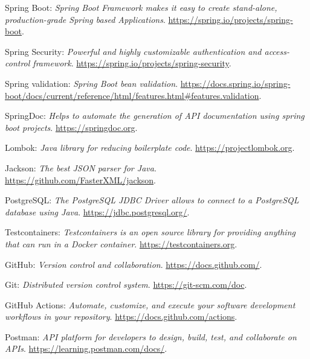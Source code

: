 \begin{thebibliography}{99}
    Spring Boot: \emph{Spring Boot Framework makes it easy to create stand-alone, production-grade Spring based Applications}. \url{https://spring.io/projects/spring-boot}.

    Spring Security: \emph{Powerful and highly customizable authentication and access-control framework}. \url{https://spring.io/projects/spring-security}.

    Spring validation: \emph{Spring Boot bean validation}. \url{https://docs.spring.io/spring-boot/docs/current/reference/html/features.html#features.validation}.

    SpringDoc: \emph{Helps to automate the generation of API documentation using spring boot projects}. \url{https://springdoc.org}.

    Lombok: \emph{Java library for reducing boilerplate code}. \url{https://projectlombok.org}.

    Jackson: \emph{The best JSON parser for Java}. \url{https://github.com/FasterXML/jackson}.

    PostgreSQL: \emph{The PostgreSQL JDBC Driver allows to connect to a PostgreSQL database using Java}. \url{https://jdbc.postgresql.org/}.
    
    Testcontainers: \emph{Testcontainers is an open source library for providing anything that can run in a Docker container}. \url{https://testcontainers.org}.

    GitHub: \emph{Version control and collaboration}. \url{https://docs.github.com/}.

    Git: \emph{Distributed version control system}. \url{https://git-scm.com/doc}.

    GitHub Actions: \emph{Automate, customize, and execute your software development workflows in your repository}. \url{https://docs.github.com/actions}.

    Postman: \emph{API platform for developers to design, build, test, and collaborate on APIs}. \url{https://learning.postman.com/docs/}.

\end{thebibliography}
